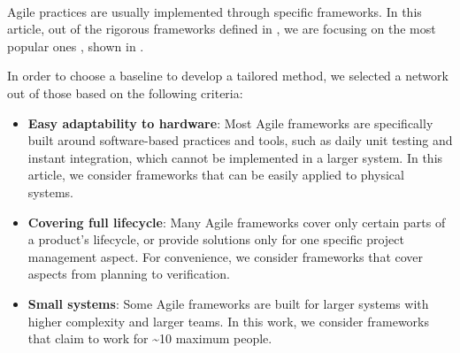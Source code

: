 \documentclass[]{iac}
\def\todo#1{}
\begin{document}
    \paragraph{}

    Agile practices are usually implemented through specific frameworks. In this article, out of the rigorous frameworks defined in \textcite{boehm_balancing_2004}, we are focusing on the most popular ones \autocite{noauthor_status_nodate}, shown in .
        



    
    In order to choose a baseline to develop a tailored method, we selected a network out of those based on the following criteria:
    \begin{itemize}
        \item \textbf{Easy adaptability to hardware}: Most Agile frameworks are specifically built around software-based practices and tools, such as daily unit testing and instant integration, which cannot be implemented in a larger system. In this article, we consider frameworks that can be easily applied to physical systems.
        \item \textbf{Covering full lifecycle}: Many Agile frameworks cover only certain parts of a product's lifecycle, or provide solutions only for one specific project management aspect. For convenience, we consider frameworks that cover aspects from planning to verification.
        \item \textbf{Small systems}: Some Agile frameworks are built for larger systems with higher complexity and larger teams. In this work, we consider frameworks that claim to work for \textasciitilde 10 maximum people.
    \end{itemize}
\end{document}
